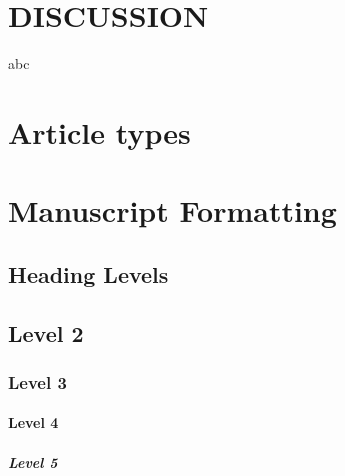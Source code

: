 \documentclass[utf8]{frontiersSCNS} %
\begin{document}
\section{DISCUSSION}
abc

\section*{Article types}



\section{Manuscript Formatting}

\subsection{Heading Levels}


\subsection{Level 2}
\subsubsection{Level 3}
\paragraph{Level 4}
\subparagraph{Level 5}

\end{document}
